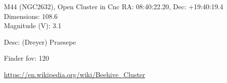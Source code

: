 \begin{block}{M44 (NGC2632), Open Cluster in Cnc}
    RA: 08:40:22.20, Dec: +19:40:19.4 \\ 
    Dimensions: 108.6 \\ 
    Magnitude (V): 3.1


    Desc: (Dreyer) Praesepe 

    Finder fov: 120 

    \url{https://en.wikipedia.org/wiki/Beehive_Cluster} 
\end{block}